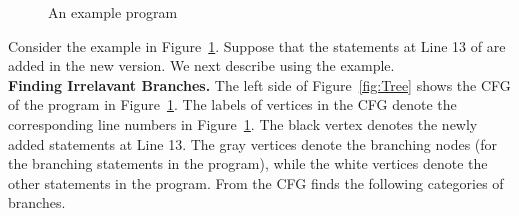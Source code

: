 \begin{figure}[t]
\begin{CodeOut}
\begin{alltt}
\end{alltt}
\end{CodeOut}
\vspace{-0.9 cm}
\caption{An example program}
\vspace{-0.7 cm}
\label{fig:example}
\end{figure}

Consider the example in Figure~\ref{fig:example}. Suppose that the statements at Line 13 of  are added in the new version. We next describe  using the example.
\\ \textbf{Finding Irrelavant Branches.} 
The left side of Figure~\ref{fig:Tree} shows the CFG of the program in Figure~\ref{fig:example}. The labels of vertices in the CFG denote the corresponding line numbers in Figure~\ref{fig:example}. The black vertex denotes the newly added statements at Line 13. The gray vertices denote the branching nodes (for the branching statements in the program), while the white vertices denote the other statements in the program. From the CFG  finds the following categories of branches.
